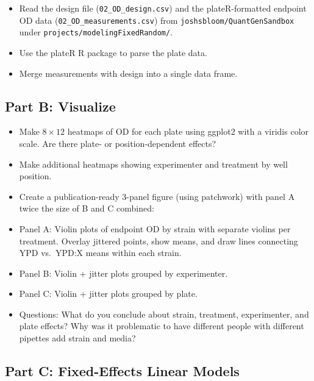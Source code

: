 \begin{dobox}[Tasks]
\begin{itemize}[nosep]
  \item Read the design file (\texttt{02\_OD\_design.csv}) and the plateR-formatted endpoint OD data (\texttt{02\_OD\_measurements.csv}) from \texttt{joshsbloom/QuantGenSandbox} under \texttt{projects/modelingFixedRandom/}.
  \item Use the plateR R package to parse the plate data.
  \item Merge measurements with design into a single data frame.
\end{itemize}
\end{dobox}

\subsection{Part B: Visualize}

\begin{dobox}[Tasks]
\begin{itemize}[nosep]
  \item Make $8 \times 12$ heatmaps of OD for each plate using ggplot2 with a viridis color scale. Are there plate- or position-dependent effects?
  \item Make additional heatmaps showing experimenter and treatment by well position.
  \item Create a publication-ready 3-panel figure (using patchwork) with panel A twice the size of B and C combined:
  \item Panel A: Violin plots of endpoint OD by strain with separate violins per treatment. Overlay jittered points, show means, and draw lines connecting YPD vs.\ YPD:X means within each strain.
  \item Panel B: Violin + jitter plots grouped by experimenter.
  \item Panel C: Violin + jitter plots grouped by plate.
  \item Questions: What do you conclude about strain, treatment, experimenter, and plate effects? Why was it problematic to have different people with different pipettes add strain and media?
\end{itemize}
\end{dobox}

\subsection{Part C: Fixed-Effects Linear Models}

